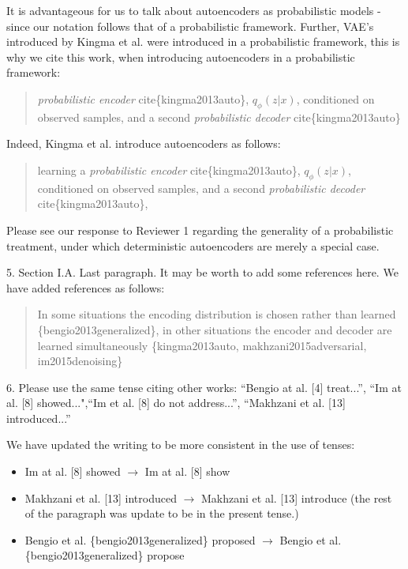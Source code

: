 \documentclass{article}
\begin{document}
It is advantageous for us to talk about autoencoders as probabilistic models - since our notation follows that of a probabilistic framework. Further, VAE's introduced by Kingma et al. were introduced in a probabilistic framework, this is why we cite this work, when introducing autoencoders in a probabilistic framework: 
    \begin{quote}
    \textit{probabilistic encoder} cite\{kingma2013auto\}, $q_\phi(z|x)$, conditioned on observed samples, and a second \textit{probabilistic decoder} cite\{kingma2013auto\}
    \end{quote}

Indeed, Kingma et al. introduce autoencoders as follows:
    \begin{quote}
        learning a \textit{probabilistic encoder} cite\{kingma2013auto\}, $q_\phi(z|x)$, conditioned on observed samples, and a second \textit{probabilistic decoder} cite\{kingma2013auto\},
    \end{quote} 
Please see our response to Reviewer 1 regarding the generality of a probabilistic treatment, under which deterministic autoencoders are merely a special case.

{\color{blue}
5. Section I.A. Last paragraph. It may be worth to add some references here.} \newline
We have added references as follows:
\begin{quote}
    In some situations the encoding distribution is chosen rather than learned \{bengio2013generalized\}, in other situations the encoder and decoder are learned simultaneously \{kingma2013auto, makhzani2015adversarial, im2015denoising\}
\end{quote}

{\color{blue}
6. Please use the same tense citing other works: ``Bengio at al. [4] treat...'', ``Im at al. [8] showed...",``Im et al. [8] do not address...'', ``Makhzani et al. [13] introduced...''}\\


{\color{red}
We have updated the writing to be more consistent in the use of tenses:
\begin{itemize}
    \item Im at al. [8] showed $\rightarrow$ Im at al. [8] show
    \item Makhzani et al. [13] introduced $\rightarrow$ Makhzani et al. [13] introduce (the rest of the paragraph was update to be in the present tense.)
    \item Bengio et al. \{bengio2013generalized\} proposed $\rightarrow$ Bengio et al. \{bengio2013generalized\} propose
\end{itemize}
}
\end{document}
